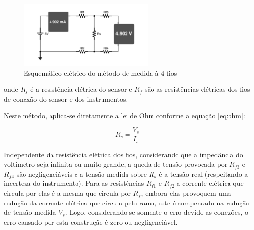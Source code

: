 \documentclass[12pt,a4paper]{instrumentacao}
\begin{document}
\begin{figure}[H]
\centering
\includegraphics[width=0.6\textwidth]{4WireMeasure.pdf}
\caption{Esquemático elétrico do método de medida à 4 fios}
\label{fig:4wire-circuit}
\end{figure}

onde $R_s$ é a resistência elétrica do sensor e $R_f$ são as resistências elétricas dos fios de conexão do sensor e dos instrumentos.

Neste método, aplica-se diretamente a lei de Ohm conforme a equação \ref{eq:ohm}:

\begin{equation}
	R_s = \frac{V_s}{I_s}
	\label{eq:ohm}
\end{equation}

Independente da resistência elétrica dos fios, considerando que a impedância do voltímetro seja infinita ou muito grande, a queda de tensão provocada por $R_{f3}$ e $R_{f4}$ são negligenciáveis e a tensão medida sobre $R_s$ é a tensão real (respeitando a incerteza do instrumento). Para as resistências $R_{f1}$ e $R_{f2}$ a corrente elétrica que circula por elas é a mesma que circula por $R_s$, embora elas provoquem uma redução da corrente elétrica que circula pelo ramo, este é compensado na redução de tensão medida $V_s$. Logo, considerando-se somente o erro devido as conexões, o erro causado por esta construção é zero ou negligenciável.





\end{document}
